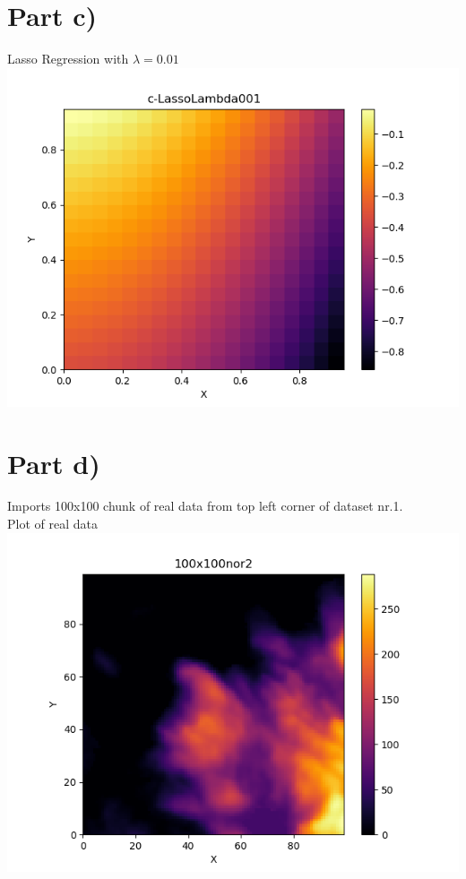 \documentclass[a4paper,norsk]{article}
\begin{document}
\section*{Part c)}
Lasso Regression with $\lambda = 0.01$
\\ \includegraphics[scale=.7]{c-LassoLambda001}
\clearpage

\section*{Part d)}
Imports 100x100 chunk of real data from top left corner of dataset nr.1.
\\Plot of real data
\\ \includegraphics[scale=.7]{100x100nor2}
\clearpage
\end{document}
